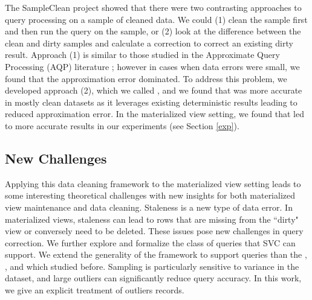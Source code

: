 The SampleClean project showed that there were two contrasting approaches to query processing on a sample of cleaned data.
We could (1) clean the sample first and then run the query on the sample, or (2) look at the difference between the clean and dirty samples and calculate a correction to correct an existing dirty result. 
Approach (1) is similar to those studied in the Approximate Query Processing (AQP) literature \cite{OlkenR86,AgarwalMPMMS13, joshi2008materialized}; however in cases when data errors were small, we found that the approximation error dominated.
To address this problem, we developed approach (2), which we called \nsc, and we found that \nsc was more accurate in mostly clean datasets as it leverages existing deterministic results leading to reduced approximation error.
In the materialized view setting, we found that \nsc led to more accurate results in our experiments (see Section \ref{exp}). 


\subsection{New Challenges}
Applying this data cleaning framework to the materialized view setting leads to some interesting theoretical challenges with new insights for both materialized view maintenance and data cleaning.
Staleness is a new type of data error.
In materialized views, staleness can lead to rows that are missing from the ``dirty" view or conversely need to be deleted. These issues pose new challenges in  query correction. 
We further explore and formalize the class of queries that SVC can support.
We extend the generality of the framework to support queries than the \sumfunc, \avgfunc, and \countfunc which studied before.
Sampling is particularly sensitive to variance in the dataset, and large outliers can significantly reduce query accuracy.
In this work, we give an explicit treatment of outliers records. 

